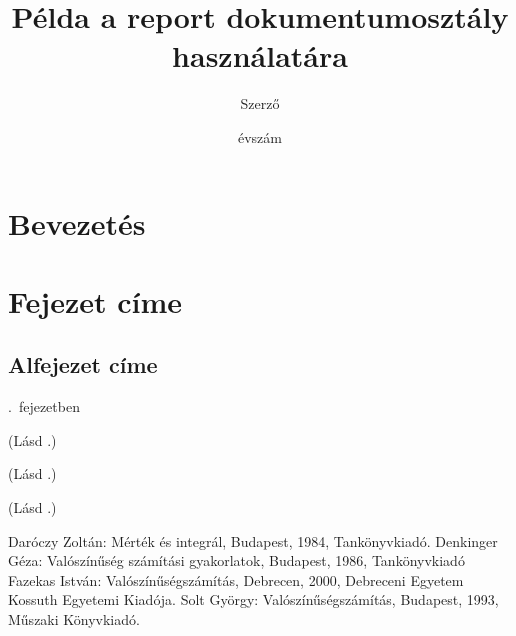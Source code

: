 \documentclass[12pt, twoside]{report}
\begin{document}
	\title{Példa a report dokumentumosztály használatára}
	\author{Szerző}
	\date{évszám}
	\maketitle
	
	\tableofcontents
	\chapter*{Bevezetés}
	\hulipsum
	
	\chapter{Fejezet címe}\label{chapter-valoszinuseg}
	\section{Alfejezet címe}
	
	.~fejezetben
	\hulipsum
	
	(Lásd \cite{DENKINGER}.)
	
	(Lásd \cite[15.~oldal]{DENKINGER}.)
	
	(Lásd \cite{DAROCZY, FAZEKAS}.)
	
	\begin{thebibliography}{4}
		Daróczy Zoltán: Mérték és integrál, Budapest, 1984, Tankönyvkiadó.
		Denkinger Géza: Valószínűség számítási gyakorlatok, Budapest, 1986, Tankönyvkiadó
		Fazekas István: Valószínűségszámítás, Debrecen, 2000, Debreceni Egyetem Kossuth Egyetemi Kiadója.
		Solt György: Valószínűségszámítás, Budapest, 1993, Műszaki Könyvkiadó.
	\end{thebibliography}
\end{document}
